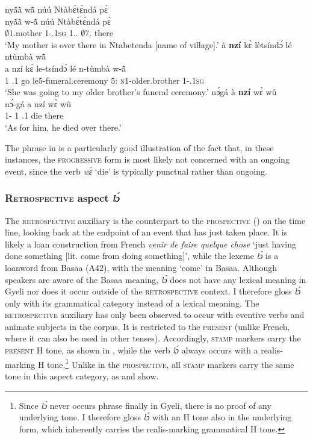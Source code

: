 \ea\label{progback}
\ea \label{progback1}
  \glll  nyã́ã̀ wã̂ núú Ntàbɛ̀tɛ́ndá pɛ̀\\
         nyã́ã̀ w-ã̂ núú Ntàbɛ̀tɛ́ndá pɛ̀ \\
          $\emptyset$1.mother 1-{\POSS}.1\textsc{sg} 1.{\DEM}.{\DIST} $\emptyset$7.{\PN} there\\
    \trans `My mother is over there in Ntabetenda [name of village].'
\ex\label{progback2} 
  \glll à {\bfseries nzí} kɛ̀ lètsíndɔ́ lé ntùmbà wã̂\\
        a nzí kɛ̀ le-tsíndɔ́ lé n-tùmbà w-ã̂ \\
         1 {\PROG}.{\PST}1 go le5-funeral.ceremony 5:{\ATT} \textsc{n}1-older.brother 1-{\POSS}.1\textsc{sg}   \\
    \trans `She was going to my older brother's funeral ceremony.'
\ex\label{progback3} 
  \glll nɔ́gá à {\bfseries nzí} wɛ̀ wû \\
        nɔ́-gá a nzí wɛ̀ wû \\
         1-{\CONTR} 1 {\PROG}.{\PST}1 die there\\
    \trans `As for him, he died over there.'
\z
\z

\noindent The phrase in  is a particularly good illustration of the fact that, in these instances, the \textsc{progressive} form is most likely not concerned with an ongoing event, since the verb {\itshape wɛ̀} `die' is typically punctual rather than ongoing.



\subsubsection{\textsc{Retrospective} aspect {\itshape lɔ́}}
\label{sec:RETROaspect}


The \textsc{retrospective} auxiliary is the counterpart to the \textsc{prospective} () on the time line, looking back at the endpoint of an event that has just taken place. It is likely a loan construction from French {\itshape venir de faire quelque chose} `just having done something [lit. come from doing something]', while the lexeme {\itshape lɔ́} is a loanword from Basaa (A42), with the meaning `come' in Basaa. Although speakers are aware of the Basaa meaning, {\itshape lɔ́} does not have any lexical meaning in Gyeli nor does it occur outside of the \textsc{retrospective} context. I therefore gloss {\itshape lɔ́} only with its grammatical category instead of a lexical meaning. The \textsc{retrospective} auxiliary has only been observed to occur with eventive verbs and animate subjects in the corpus. It is restricted to the \textsc{present} (unlike French, where it can also be used in other tenses). Accordingly, \textsc{stamp} markers carry the \textsc{present} H tone, as shown in , while the verb {\itshape lɔ́} always occurs with a realis-marking H tone.\footnote{Since {\itshape lɔ́} never occurs phrase finally in Gyeli, there is no proof of any underlying tone. I therefore gloss {\itshape lɔ́} with an H tone also in the underlying form, which inherently carries the realis-marking grammatical H tone.} Unlike in the \textsc{prospective}, all \textsc{stamp} markers carry the same tone in this aspect category, as  and  show.


